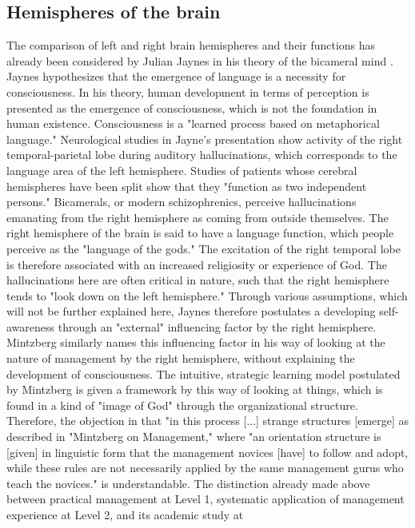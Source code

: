 \documentclass[a4paper,12pt]{article}
\begin{document}
\subsection{Hemispheres of the brain}

The comparison of left and right brain hemispheres and their functions has
already been considered by Julian Jaynes in his theory of the bicameral mind
\cite{Jaynes}. Jaynes hypothesizes that the emergence of language is a
necessity for consciousness. In his theory, human development in terms of
perception is presented as the emergence of consciousness, which is not the
foundation in human existence. Consciousness is a "learned process based on
metaphorical language." Neurological studies in Jayne's presentation show
activity of the right temporal-parietal lobe during auditory hallucinations,
which corresponds to the language area of the left hemisphere. Studies of
patients whose cerebral hemispheres have been split show that they "function
as two independent persons." Bicamerals, or modern schizophrenics, perceive
hallucinations emanating from the right hemisphere as coming from outside
themselves. The right hemisphere of the brain is said to have a language
function, which people perceive as the "language of the gods." The excitation
of the right temporal lobe is therefore associated with an increased
religiosity or experience of God. The hallucinations here are often critical
in nature, such that the right hemisphere tends to "look down on the left
hemisphere." Through various assumptions, which will not be further explained
here, Jaynes therefore postulates a developing self-awareness through an
"external" influencing factor by the right hemisphere. Mintzberg similarly
names this influencing factor in his way of looking at the nature of
management by the right hemisphere, without explaining the development of
consciousness. The intuitive, strategic learning model postulated by Mintzberg
is given a framework by this way of looking at things, which is found in a
kind of "image of God" through the organizational structure. Therefore, the
objection in \cite{seminar} that "in this process [...] strange structures
[emerge] as described in "Mintzberg on Management," where "an orientation
structure is [given] in linguistic form that the management novices [have] to
follow and adopt, while these rules are not necessarily applied by the same
management gurus who teach the novices." is understandable. The distinction
already made above between practical management at Level 1, systematic
application of management experience at Level 2, and its academic study at
\end{document}
